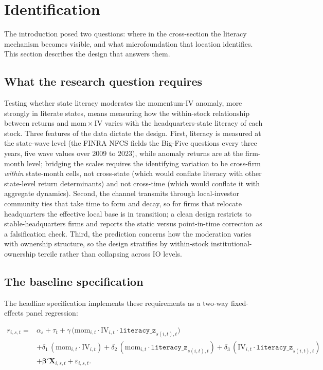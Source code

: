 \section{Identification}
\label{sec:identification}

The introduction posed two questions: where in the cross-section the literacy mechanism becomes visible, and what microfoundation that location identifies. This section describes the design that answers them.

\subsection{What the research question requires}

Testing whether state literacy moderates the momentum-IV anomaly, more strongly in literate states, means measuring how the within-stock relationship between returns and $\mathrm{mom}\times\mathrm{IV}$ varies with the headquarters-state literacy of each stock. Three features of the data dictate the design. First, literacy is measured at the state-wave level (the FINRA NFCS fields the Big-Five questions every three years, five wave values over 2009 to 2023), while anomaly returns are at the firm-month level; bridging the scales requires the identifying variation to be cross-firm \emph{within} state-month cells, not cross-state (which would conflate literacy with other state-level return determinants) and not cross-time (which would conflate it with aggregate dynamics). Second, the channel transmits through local-investor community ties that take time to form and decay, so for firms that relocate headquarters the effective local base is in transition; a clean design restricts to stable-headquarters firms and reports the static versus point-in-time correction as a falsification check. Third, the prediction concerns how the moderation varies with ownership structure, so the design stratifies by within-stock institutional-ownership tercile rather than collapsing across IO levels.

\subsection{The baseline specification}

The headline specification implements these requirements as a two-way fixed-effects panel regression:

\begin{equation}
\label{eq:headline}
\begin{split}
r_{i,s,t} = {}& \alpha_{s} + \tau_{t} + \gamma \,\bigl(\mathrm{mom}_{i,t}\cdot\mathrm{IV}_{i,t}\cdot\mathtt{literacy\_z}_{s(i,t),t}\bigr) \\
& + \delta_{1}\,(\mathrm{mom}_{i,t}\cdot\mathrm{IV}_{i,t}) + \delta_{2}\,(\mathrm{mom}_{i,t}\cdot\mathtt{literacy\_z}_{s(i,t),t}) + \delta_{3}\,(\mathrm{IV}_{i,t}\cdot\mathtt{literacy\_z}_{s(i,t),t}) \\
& + \boldsymbol{\beta}'\mathbf{X}_{i,s,t} + \varepsilon_{i,s,t}.
\end{split}
\end{equation}

